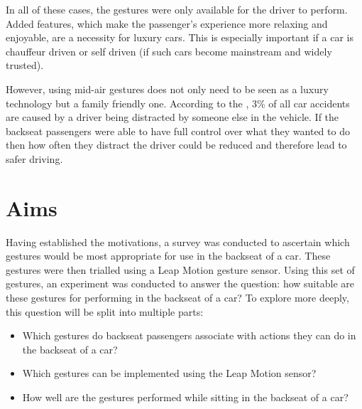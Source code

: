 \documentclass{l4proj}
\begin{document}
In all of these cases, the gestures were only available for the driver to perform. Added features, which make the passenger's experience more relaxing and enjoyable, are a necessity for luxury cars. This is especially important if a car is chauffeur driven or self driven (if such cars become mainstream and widely trusted). 

However, using mid-air gestures does not only need to be seen as a luxury technology but a family friendly one. According to the \cite{Department_for_Transport_2017}, 3\% of all car accidents are caused by a driver being distracted by someone else in the vehicle. If the backseat passengers were able to have full control over what they wanted to do then how often they distract the driver could be reduced and therefore lead to safer driving.

\section{Aims}
Having established the motivations, a survey was conducted to ascertain which gestures would be most appropriate for use in the backseat of a car. These gestures were then trialled using a Leap Motion gesture sensor. Using this set of gestures, an experiment was conducted to answer the question: how suitable are these gestures for performing in the backseat of a car?
To explore more deeply, this question will be split into multiple parts: 
\begin{itemize}
\item Which gestures do backseat passengers associate with actions they can do in the backseat of a car?
\item Which gestures can be implemented using the Leap Motion sensor?
\item How well are the gestures performed while sitting in the backseat of a car?
\end{itemize}
\end{document}
